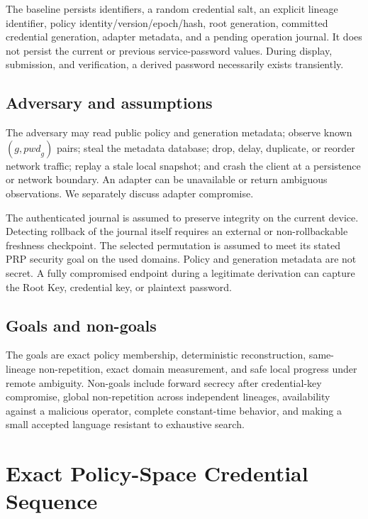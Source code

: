 \documentclass[preprint,12pt]{elsarticle}
\begin{document}
The baseline persists identifiers, a random credential salt, an explicit
lineage identifier, policy identity/version/epoch/hash, root generation,
committed credential generation, adapter metadata, and a pending operation
journal. It does not persist the current or previous service-password values.
During display, submission, and verification, a derived password necessarily
exists transiently.

\subsection{Adversary and assumptions}

The adversary may read public policy and generation metadata; observe known
$(g,\mathit{pwd}_g)$ pairs; steal the metadata database; drop, delay, duplicate,
or reorder network traffic; replay a stale local snapshot; and crash the client
at a persistence or network boundary. An adapter can be unavailable or return
ambiguous observations. We separately discuss adapter compromise.

The authenticated journal is assumed to preserve integrity on the current
device. Detecting rollback of the journal itself requires an external or
non-rollbackable freshness checkpoint. The selected permutation is assumed to
meet its stated PRP security goal on the used domains. Policy and generation
metadata are not secret. A fully compromised endpoint during a legitimate
derivation can capture the Root Key, credential key, or plaintext password.

\subsection{Goals and non-goals}

The goals are exact policy membership, deterministic reconstruction,
same-lineage non-repetition, exact domain measurement, and safe local progress
under remote ambiguity. Non-goals include forward secrecy after credential-key
compromise, global non-repetition across independent lineages, availability
against a malicious operator, complete constant-time behavior, and making a
small accepted language resistant to exhaustive search.



\section{Exact Policy-Space Credential Sequence}
\end{document}
